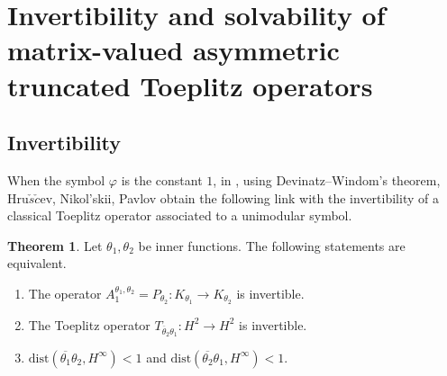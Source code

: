 \documentclass{amsart}
\theoremstyle{definition}
\newtheorem{thm}{Theorem}[section]
\newcommand{\h}{\mathcal{\mathcal H}}
\newcommand{\oL }{\mathcal{L}(E) }
\begin{document}


\medskip



\medskip




\medskip
\section{\bf{Invertibility and solvability of matrix-valued asymmetric truncated Toeplitz operators}} \label{s4}
\subsection{Invertibility}
When the symbol $\varphi$ is the constant $1$, in \cite{HNP}, using Devinatz--Windom's theorem, %
Hru$\check{s}\check{c}$ev,  Nikol'skii,  Pavlov obtain the following link with the invertibility of a classical Toeplitz operator associated to a unimodular symbol. 

\begin{thm}\cite[Theorem 4]{HNP}\label{1}
Let $\theta_1,\theta_2$ be inner functions. The following statements are equivalent.
\begin{enumerate}
\item The operator $A_{1}^{\theta_{1},\theta_{2}}=P_{\theta_{2}}:K_{\theta_{1}}\to K_{\theta_{2}}$ is invertible.
\item The Toeplitz operator $T_{\overline{\theta}_{2}\theta_{1}}:H^{2}\to H^{2}$ is invertible.
\item $\mbox{dist}(\overline{\theta_1}\theta_2,H^\infty)<1$ and $\mbox{dist}(\overline{\theta_2}\theta_1,H^\infty)<1$.
\end{enumerate}
\end{thm}
\end{document}
